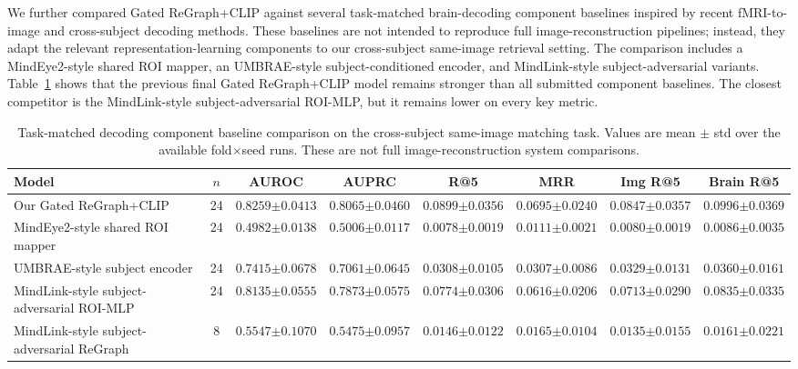 \documentclass{article}
\begin{document}
We further compared Gated ReGraph+CLIP against several task-matched brain-decoding component baselines inspired by recent fMRI-to-image and cross-subject decoding methods. These baselines are not intended to reproduce full image-reconstruction pipelines; instead, they adapt the relevant representation-learning components to our cross-subject same-image retrieval setting. The comparison includes a MindEye2-style shared ROI mapper, an UMBRAE-style subject-conditioned encoder, and MindLink-style subject-adversarial variants. Table~\ref{tab:sota_baselines} shows that the previous final Gated ReGraph+CLIP model remains stronger than all submitted component baselines. The closest competitor is the MindLink-style subject-adversarial ROI-MLP, but it remains lower on every key metric.

\begin{table}[!htbp]
  \centering
  \caption{Task-matched decoding component baseline comparison on the cross-subject same-image matching task. Values are mean $\pm$ std over the available fold$\times$seed runs. These are not full image-reconstruction system comparisons.}
  \label{tab:sota_baselines}
  \scriptsize
  \setlength{\tabcolsep}{2.8pt}
  \renewcommand{\arraystretch}{1.15}
  \begin{tabular}{lccccccc}
    \toprule
    Model & $n$ & AUROC & AUPRC & R@5 & MRR & Img R@5 & Brain R@5 \\
    \midrule
    Our Gated ReGraph+CLIP
    & 24 & $\mathbf{0.8259{\scriptstyle\pm0.0413}}$ & $\mathbf{0.8065{\scriptstyle\pm0.0460}}$ & $\mathbf{0.0899{\scriptstyle\pm0.0356}}$ & $\mathbf{0.0695{\scriptstyle\pm0.0240}}$ & $\mathbf{0.0847{\scriptstyle\pm0.0357}}$ & $\mathbf{0.0996{\scriptstyle\pm0.0369}}$ \\
    MindEye2-style shared ROI mapper
    & 24 & $0.4982{\scriptstyle\pm0.0138}$ & $0.5006{\scriptstyle\pm0.0117}$ & $0.0078{\scriptstyle\pm0.0019}$ & $0.0111{\scriptstyle\pm0.0021}$ & $0.0080{\scriptstyle\pm0.0019}$ & $0.0086{\scriptstyle\pm0.0035}$ \\
    UMBRAE-style subject encoder
    & 24 & $0.7415{\scriptstyle\pm0.0678}$ & $0.7061{\scriptstyle\pm0.0645}$ & $0.0308{\scriptstyle\pm0.0105}$ & $0.0307{\scriptstyle\pm0.0086}$ & $0.0329{\scriptstyle\pm0.0131}$ & $0.0360{\scriptstyle\pm0.0161}$ \\
    MindLink-style subject-adversarial ROI-MLP
    & 24 & $0.8135{\scriptstyle\pm0.0555}$ & $0.7873{\scriptstyle\pm0.0575}$ & $0.0774{\scriptstyle\pm0.0306}$ & $0.0616{\scriptstyle\pm0.0206}$ & $0.0713{\scriptstyle\pm0.0290}$ & $0.0835{\scriptstyle\pm0.0335}$ \\
    MindLink-style subject-adversarial ReGraph
    & 8 & $0.5547{\scriptstyle\pm0.1070}$ & $0.5475{\scriptstyle\pm0.0957}$ & $0.0146{\scriptstyle\pm0.0122}$ & $0.0165{\scriptstyle\pm0.0104}$ & $0.0135{\scriptstyle\pm0.0155}$ & $0.0161{\scriptstyle\pm0.0221}$ \\
    \bottomrule
  \end{tabular}
\end{table}
\end{document}
